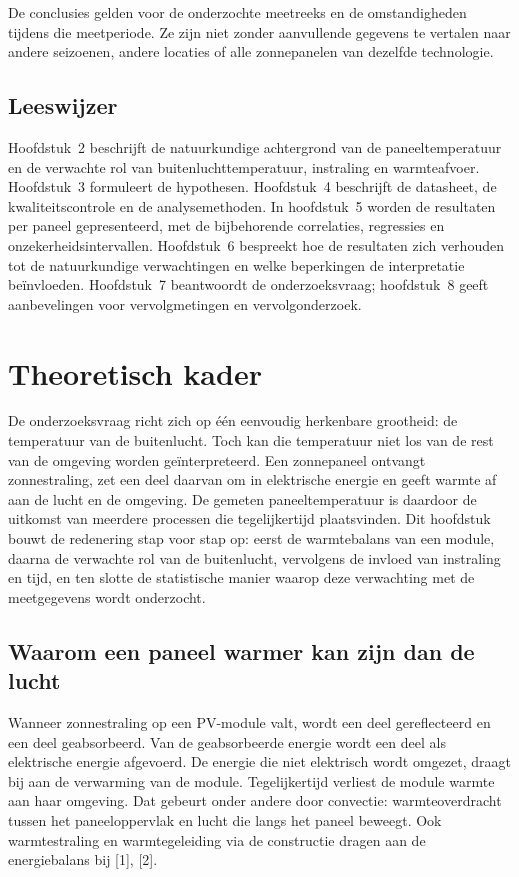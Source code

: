 \documentclass[12pt,a4paper]{article}
\begin{document}
De conclusies gelden voor de onderzochte meetreeks en de omstandigheden tijdens die meetperiode. Ze zijn niet zonder aanvullende gegevens te vertalen naar andere seizoenen, andere locaties of alle zonnepanelen van dezelfde technologie.

\subsection{Leeswijzer}

Hoofdstuk~2 beschrijft de natuurkundige achtergrond van de paneeltemperatuur en de verwachte rol van buitenluchttemperatuur, instraling en warmteafvoer. Hoofdstuk~3 formuleert de hypothesen. Hoofdstuk~4 beschrijft de datasheet, de kwaliteitscontrole en de analysemethoden. In hoofdstuk~5 worden de resultaten per paneel gepresenteerd, met de bijbehorende correlaties, regressies en onzekerheidsintervallen. Hoofdstuk~6 bespreekt hoe de resultaten zich verhouden tot de natuurkundige verwachtingen en welke beperkingen de interpretatie beïnvloeden. Hoofdstuk~7 beantwoordt de onderzoeksvraag; hoofdstuk~8 geeft aanbevelingen voor vervolgmetingen en vervolgonderzoek.

\section{Theoretisch kader}

De onderzoeksvraag richt zich op één eenvoudig herkenbare grootheid: de temperatuur van de buitenlucht. Toch kan die temperatuur niet los van de rest van de omgeving worden geïnterpreteerd. Een zonnepaneel ontvangt zonnestraling, zet een deel daarvan om in elektrische energie en geeft warmte af aan de lucht en de omgeving. De gemeten paneeltemperatuur is daardoor de uitkomst van meerdere processen die tegelijkertijd plaatsvinden. Dit hoofdstuk bouwt de redenering stap voor stap op: eerst de warmtebalans van een module, daarna de verwachte rol van de buitenlucht, vervolgens de invloed van instraling en tijd, en ten slotte de statistische manier waarop deze verwachting met de meetgegevens wordt onderzocht.

\subsection{Waarom een paneel warmer kan zijn dan de lucht}

Wanneer zonnestraling op een PV-module valt, wordt een deel gereflecteerd en een deel geabsorbeerd. Van de geabsorbeerde energie wordt een deel als elektrische energie afgevoerd. De energie die niet elektrisch wordt omgezet, draagt bij aan de verwarming van de module. Tegelijkertijd verliest de module warmte aan haar omgeving. Dat gebeurt onder andere door convectie: warmteoverdracht tussen het paneeloppervlak en lucht die langs het paneel beweegt. Ook warmtestraling en warmtegeleiding via de constructie dragen aan de energiebalans bij [1], [2].
\end{document}
